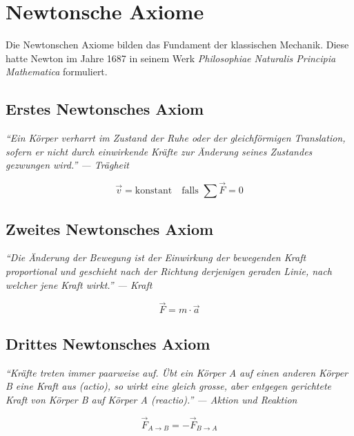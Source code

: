 \chapter{Newtonsche Axiome}
Die Newtonschen Axiome bilden das Fundament der klassischen Mechanik. Diese
hatte Newton im Jahre 1687 in seinem Werk 
\textit{Philosophiae Naturalis Principia Mathematica} formuliert. 

\section{Erstes Newtonsches Axiom}
\textit{"`Ein Körper verharrt im Zustand der Ruhe oder der gleichförmigen 
Translation, sofern er nicht durch einwirkende Kräfte zur Änderung seines 
Zustandes gezwungen wird."' --- Trägheit}

\[ \boxed{\vec{v} = \text{konstant}} \quad \text{falls } \sum\vec{F}=0 \]

\section{Zweites Newtonsches Axiom} 
\textit{"`Die Änderung der Bewegung ist der Einwirkung der bewegenden Kraft 
proportional und geschieht nach der Richtung derjenigen geraden Linie, nach
welcher jene Kraft wirkt."' --- Kraft}

\[ \boxed{\vec{F} = m \cdot \vec{a}} \]

\section{Drittes Newtonsches Axiom}
\textit{"`Kräfte treten immer paarweise auf. Übt ein Körper A auf einen 
anderen Körper B eine Kraft aus (actio), so wirkt eine gleich grosse, aber
entgegen gerichtete Kraft von Körper B auf Körper A (reactio)."' --- 
Aktion und Reaktion}

\[ \boxed{\vec{F}_{A \rightarrow B} = - \vec{F}_{B \rightarrow A}} \]
